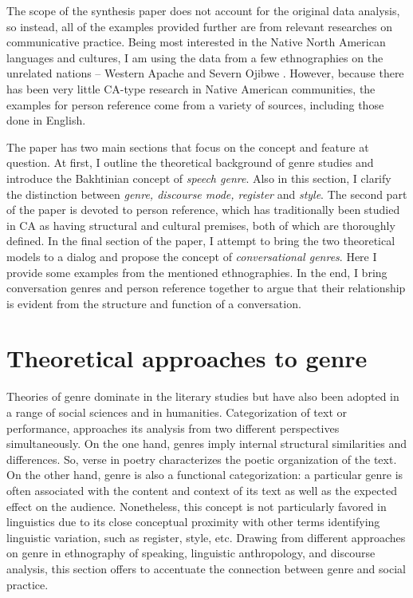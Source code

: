 \documentclass[12pt, draft]{article}
\begin{document}
The scope of the synthesis paper does not account for the original data analysis, so instead, all of the examples provided further are from relevant researches on communicative practice. Being most interested in the Native North American languages and cultures, I am using the data from a few ethnographies on the unrelated nations -- Western Apache \parencite{basso1996, basso1990, samuels2004} and Severn Ojibwe \parencite{valentine1995}. However, because there has been very little CA-type research in Native American communities, the examples for person reference come from a variety of sources, including those done in English. 

The paper has two main sections that focus on the concept and feature at question. At first, I  outline the theoretical background of genre studies and introduce the Bakhtinian concept of \textit{speech genre}. Also in this section, I  clarify the distinction between \textit{genre, discourse mode, register} and \textit{style}. The second part of the paper is devoted to person reference, which has traditionally been studied in CA as having structural and cultural premises, both of which are thoroughly defined. In the final section of the paper, I attempt to bring the two theoretical models to a dialog and propose the concept of \textit{conversational genres}. Here I provide some examples from the mentioned ethnographies. In the end, I bring conversation genres and person reference together to argue that their relationship is evident from the structure and function of a conversation.
\section{Theoretical approaches to genre}
Theories of genre dominate in the literary studies but have also been adopted in a range of social sciences and in humanities. Categorization of text or performance, approaches its analysis from two different perspectives simultaneously. On the one hand, genres imply internal structural similarities and differences. So, verse in poetry characterizes the poetic organization of the text. On the other hand, genre is also a functional categorization: a particular genre is often associated with the content and context of its text as well as the expected effect on the audience. Nonetheless, this concept is not particularly favored in linguistics due to its close conceptual proximity with other terms identifying linguistic variation, such as register, style, etc. Drawing from different approaches on genre in ethnography of speaking, linguistic anthropology, and discourse analysis, this section offers to accentuate the connection between genre and social practice.
\end{document}
